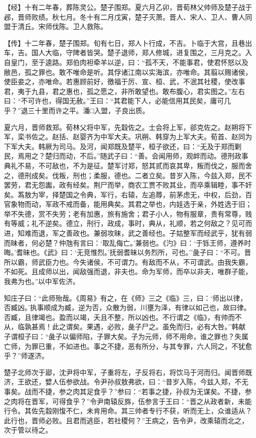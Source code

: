 \documentclass[]{article}
\begin{document}
【经】十有二年春，葬陈灵公。楚子围郑。夏六月乙卯，晋荀林父帅师及楚子战于邲，晋师败绩。秋七月。冬十有二月戊寅，楚子灭萧。晋人、宋人、卫人、曹人同盟于清丘。宋师伐陈。卫人救陈。

【传】十二年春，楚子围郑。旬有七日，郑人卜行成，不吉。卜临于大宫，且巷出车，吉。国人大临，守陴者皆哭。楚子退师，郑人修城，进复围之，三月克之。入自皇门，至于逵路。郑伯肉袒牵羊以逆，曰：``孤不天，不能事君，使君怀怒以及敝邑，孤之罪也。敢不唯命是听。其俘诸江南以实海滨，亦唯命。其翦以赐诸侯，使臣妾之，亦唯命。若惠顾前好，徼福于厉、宣、桓、武，不泯其社稷，使改事君，夷于九县，君之惠也，孤之愿之，非所敢望也。敢布腹心，君实图之。''左右曰：``不可许也，得国无赦。''王曰：``其君能下人，必能信用其民矣，庸可几乎？''退三十里而许之平。潘□入盟，子良出质。

夏六月，晋师救郑。荀林父将中军，先縠佐之。士会将上军，郤克佐之。赵朔将下军，栾书佐之。赵括、赵婴齐为中军大夫。巩朔、韩穿为上军大夫。荀首、赵同为下军大夫。韩厥为司马。及河，闻郑既及楚平，桓子欲还，曰：``无及于郑而剿民，焉用之？楚归而动，不后。''随武子曰：``善。会闻用师，观衅而动。德刑政事典礼不易，不可敌也，不为是征。楚军讨郑，怒其贰而哀其卑，叛而伐之，服而舍之，德刑成矣。伐叛，刑也；柔服，德也。二者立矣。昔岁入陈，今兹入郑，民不罢劳，君无怨讟，政有经矣。荆尸而举，商农工贾不败其业，而卒乘辑睦，事不奸矣。蒍敖为宰，择楚国之令典，军行，右辕，左追蓐，前茅虑无，中权，后劲，百官象物而动，军政不戒而备，能用典矣。其君之举也，内娃选于亲，外姓选于旧；举不失德，赏不失劳；老有加惠，旅有施舍；君子小人，物有服章，贵有常尊，贱有等威；礼不逆矣。德立，刑行，政成，事时，典从，礼顺，若之何敌之？见可而进，知难而退，军之善政也。兼弱攻昧，武之善经也。子姑整军而经武乎，犹有弱而昧者，何必楚？仲虺有言曰：`取乱侮亡。'兼弱也。《汋》曰：`于铄王师，遵养时晦。'耆昧也。《武》曰：`无竞惟烈。'抚弱耆昧以务烈所，可也。''彘子曰：``不可。晋所以霸，师武臣力也。今失诸侯，不可谓力。有敌而不从，不可谓武。由我失霸，不如死。且成师以出，闻敌强而退，非夫也。命为军师，而卒以非夫，唯群子能，我弗为也。''以中军佐济。

知庄子曰：``此师殆哉。《周易》有之，在《师》三之《临》三，曰：`师出以律，否臧凶。'执事顺成为臧，逆为否，众散为弱，川壅为泽，有律以如己也，故曰律。否臧，且律竭也。盈而以竭，夭且不整，所以凶也。不行谓之《临》，有帅而不从，临孰甚焉！此之谓矣。果遇，必败，彘子尸之。虽免而归，必有大咎。''韩献子谓桓子曰：``彘子以偏师陷，子罪大矣。子为元师，师不用命，谁之罪也？失属亡师，为罪已重，不如进也。事之不捷，恶有所分，与其专罪，六人同之，不犹愈乎？''师遂济。

楚子北师次于郔，沈尹将中军，子重将左，子反将右，将饮马于河而归。闻晋师既济，王欲还，嬖人伍参欲战。令尹孙叔敖弗欲，曰：``昔岁入陈，今兹入郑，不无事矣。战而不捷，参之肉其足食乎？''参曰：``若事之捷，孙叔为无谋矣。不捷，参之肉将在晋军，可得食乎？''令尹南辕反旆，伍参言于王曰：``晋之从政者新，未能行令。其佐先縠刚愎不仁，未肯用命。其三帅者专行不获，听而无上，众谁适从？此行也，晋师必败。且君而逃臣，若社稷何？''王病之，告令尹，改乘辕而北之，次于管以待之。
\end{document}
